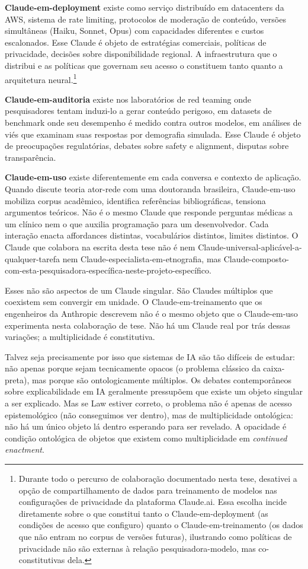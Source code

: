 \textbf{Claude-em-deployment} existe como serviço distribuído em datacenters da AWS, sistema de rate limiting, protocolos de moderação de conteúdo, versões simultâneas (Haiku, Sonnet, Opus) com capacidades diferentes e custos escalonados. Esse Claude é objeto de estratégias comerciais, políticas de privacidade, decisões sobre disponibilidade regional. A infraestrutura que o distribui e as políticas que governam seu acesso o constituem tanto quanto a arquitetura neural.\footnote{Durante todo o percurso de colaboração documentado nesta tese, desativei a opção de compartilhamento de dados para treinamento de modelos nas configurações de privacidade da plataforma Claude.ai. Essa escolha incide diretamente sobre o que constitui tanto o Claude-em-deployment (as condições de acesso que configuro) quanto o Claude-em-treinamento (os dados que não entram no corpus de versões futuras), ilustrando como políticas de privacidade não são externas à relação pesquisadora-modelo, mas co-constitutivas dela.}

\textbf{Claude-em-auditoria} existe nos laboratórios de red teaming onde pesquisadores tentam induzi-lo a gerar conteúdo perigoso, em datasets de benchmark onde seu desempenho é medido contra outros modelos, em análises de viés que examinam suas respostas por demografia simulada. Esse Claude é objeto de preocupações regulatórias, debates sobre safety e alignment, disputas sobre transparência.

\textbf{Claude-em-uso} existe diferentemente em cada conversa e contexto de aplicação. Quando discute teoria ator-rede com uma doutoranda brasileira, Claude-em-uso mobiliza corpus acadêmico, identifica referências bibliográficas, tensiona argumentos teóricos. Não é o mesmo Claude que responde perguntas médicas a um clínico nem o que auxilia programação para um desenvolvedor. Cada interação enacta affordances distintas, vocabulários distintos, limites distintos. O Claude que colabora na escrita desta tese não é nem Claude-universal-aplicável-a-qualquer-tarefa nem Claude-especialista-em-etnografia, mas Claude-composto-com-esta-pesquisadora-específica-neste-projeto-específico.

Esses não são aspectos de um Claude singular. São Claudes múltiplos que coexistem sem convergir em unidade. O Claude-em-treinamento que os engenheiros da Anthropic descrevem não é o mesmo objeto que o Claude-em-uso experimenta nesta colaboração de tese. Não há um Claude real por trás dessas variações; a multiplicidade é constitutiva.

Talvez seja precisamente por isso que sistemas de IA são tão difíceis de estudar: não apenas porque sejam tecnicamente opacos (o problema clássico da caixa-preta), mas porque são ontologicamente múltiplos. Os debates contemporâneos sobre explicabilidade em IA geralmente pressupõem que existe um objeto singular a ser explicado. Mas se Law estiver correto, o problema não é apenas de acesso epistemológico (não conseguimos ver dentro), mas de multiplicidade ontológica: não há um único objeto lá dentro esperando para ser revelado. A opacidade é condição ontológica de objetos que existem como multiplicidade em \textit{continued enactment}.

